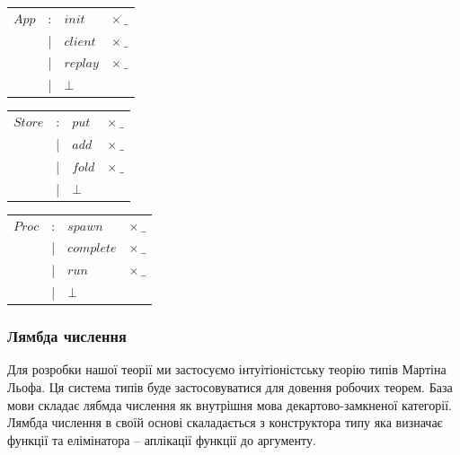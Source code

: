 \documentclass[11pt,oneside]{article}
\begin{document}
\vspace{0.5cm}

\begingroup
\parbox[l][][t]{0.33\textwidth}
{
\begin{tabular}{llll}
$App$       &:& $init$    & $\times\ \_$            \\
            &|& $client$  & $\times\ \_$          \\
            &|& $replay$  & $\times\ \_$          \\
            &|& $\bot$    & \\
\end{tabular}
}
\hspace{0.1cm}
\parbox[l][][t]{0.33\textwidth}
{
\begin{tabular}{llll}
$Store$     &:& $put$     & $\times\ \_$          \\
            &|& $add$     & $\times\ \_$          \\
            &|& $fold$    & $\times\ \_$         \\
            &|& $\bot$    & \\
\end{tabular}
}
\hspace{0.1cm}
\parbox[t][][t]{0.33\textwidth}
{
\begin{tabular}{llll}
$Proc$      &:& $spawn$       & $\times\ \_$      \\
            &|& $complete$    & $\times\ \_$         \\
            &|& $run$         & $\times\ \_$          \\
            &|& $\bot$        &
\end{tabular}
}
\endgroup

\newpage
  \subsubsection*{Лямбда числення}

Для розробки нашої теорії ми застосуємо інтуітіоністську теорію типів Мартіна Льофа.
Ця система типів буде застосовуватися для довення робочих теорем. База мови складає
лябмда числення як внутрішня мова декартово-замкненої категорії. Лямбда числення в своїй
основі скаладається з конструктора типу яка визначає функції та елімінатора -- аплікації
функції до аргументу.

\begingroup
\parbox[t][][l]{0.40\textwidth}{

\begin{prooftree}
\end{prooftree}

}
\hspace{0.1cm}
\parbox[t][][r]{0.60\textwidth}{

\begin{prooftree}
\end{prooftree}

}
\endgroup
\end{document}
